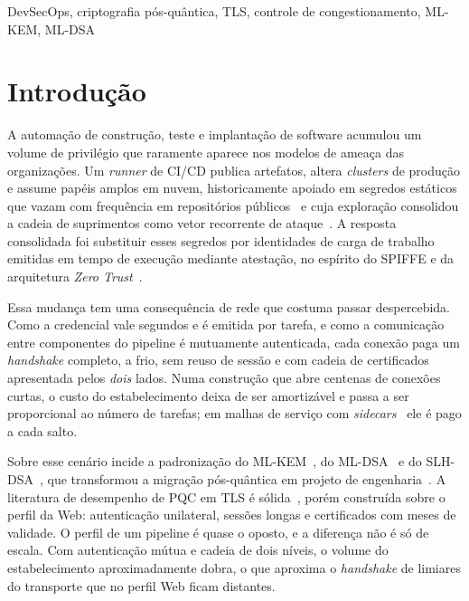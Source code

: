 \documentclass[conference]{IEEEtran}
\begin{document}
\begin{IEEEkeywords}
DevSecOps, criptografia pós-quântica, TLS, controle de congestionamento,
ML-KEM, ML-DSA
\end{IEEEkeywords}

\section{Introdução}

A automação de construção, teste e implantação de software acumulou um volume de
privilégio que raramente aparece nos modelos de ameaça das organizações. Um
\emph{runner} de CI/CD publica artefatos, altera \textit{clusters} de produção e
assume papéis amplos em nuvem, historicamente apoiado em segredos estáticos que
vazam com frequência em repositórios públicos~\cite{meli2019git} e cuja
exploração consolidou a cadeia de suprimentos como vetor recorrente de
ataque~\cite{ohm2020backstabber}. A resposta consolidada foi substituir esses
segredos por identidades de carga de trabalho emitidas em tempo de execução
mediante atestação, no espírito do SPIFFE e da arquitetura \emph{Zero
Trust}~\cite{rose2020zta,avirneni2025workload}.

Essa mudança tem uma consequência de rede que costuma passar despercebida. Como a
credencial vale segundos e é emitida por tarefa, e como a comunicação entre
componentes do pipeline é mutuamente autenticada, cada conexão paga um
\textit{handshake} completo, a frio, sem reuso de sessão e com cadeia de
certificados apresentada pelos \emph{dois} lados. Numa construção que abre
centenas de conexões curtas, o custo do estabelecimento deixa de ser amortizável
e passa a ser proporcional ao número de tarefas; em malhas de serviço com
\textit{sidecars}~\cite{ashok2021servicemesh} ele é pago a cada salto.

Sobre esse cenário incide a padronização do ML-KEM~\cite{nist2024fips203}, do
ML-DSA~\cite{nist2024fips204} e do SLH-DSA~\cite{nist2024fips205}, que
transformou a migração pós-quântica em projeto de
engenharia~\cite{shor1997polynomial,mosca2018cybersecurity}. A literatura de
desempenho de PQC em TLS é
sólida~\cite{sikeridis2020postquantum,paquin2020benchmarking,schwabe2020kemtls},
porém construída sobre o perfil da Web: autenticação unilateral, sessões longas e
certificados com meses de validade. O perfil de um pipeline é quase o oposto, e a
diferença não é só de escala. Com autenticação mútua e cadeia de dois níveis, o
volume do estabelecimento aproximadamente dobra, o que aproxima o
\textit{handshake} de limiares do transporte que no perfil Web ficam distantes.
\end{document}
